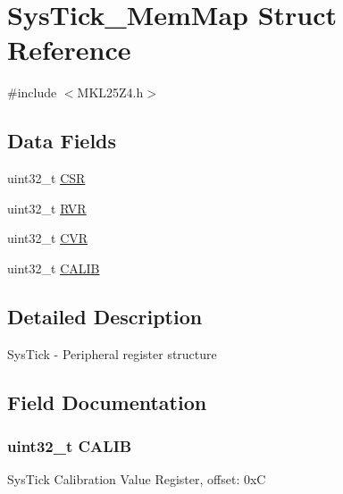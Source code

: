 \hypertarget{struct_sys_tick___mem_map}{}\section{Sys\+Tick\+\_\+\+Mem\+Map Struct Reference}
\label{struct_sys_tick___mem_map}


{\ttfamily \#include $<$M\+K\+L25\+Z4.\+h$>$}

\subsection*{Data Fields}
\begin{DoxyCompactItemize}
\item 
uint32\+\_\+t \hyperlink{struct_sys_tick___mem_map_a9f762945117456968eec12c384b1b4e1}{C\+S\+R}
\item 
uint32\+\_\+t \hyperlink{struct_sys_tick___mem_map_a46baf65a2506b0376fe5d5e76576817e}{R\+V\+R}
\item 
uint32\+\_\+t \hyperlink{struct_sys_tick___mem_map_a9a64e88c06e0550ec009f2510db2bd58}{C\+V\+R}
\item 
uint32\+\_\+t \hyperlink{struct_sys_tick___mem_map_a95f06de3371ee421b89d4be2aae51561}{C\+A\+L\+I\+B}
\end{DoxyCompactItemize}


\subsection{Detailed Description}
Sys\+Tick -\/ Peripheral register structure 

\subsection{Field Documentation}
\hypertarget{struct_sys_tick___mem_map_a95f06de3371ee421b89d4be2aae51561}{}
\subsubsection[{C\+A\+L\+I\+B}]{\setlength{\rightskip}{0pt plus 5cm}uint32\+\_\+t C\+A\+L\+I\+B}\label{struct_sys_tick___mem_map_a95f06de3371ee421b89d4be2aae51561}
Sys\+Tick Calibration Value Register, offset\+: 0x\+C \hypertarget{struct_sys_tick___mem_map_a9f762945117456968eec12c384b1b4e1}{}
